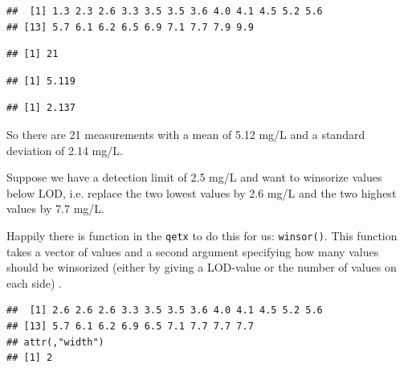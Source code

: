 \documentclass{tufte-book}
\begin{document}
\begin{knitrout}
\color{fgcolor}\begin{kframe}
\begin{alltt}
\end{alltt}
\begin{verbatim}
##  [1] 1.3 2.3 2.6 3.3 3.5 3.5 3.6 4.0 4.1 4.5 5.2 5.6
## [13] 5.7 6.1 6.2 6.5 6.9 7.1 7.7 7.9 9.9
\end{verbatim}
\begin{alltt}
\end{alltt}
\begin{verbatim}
## [1] 21
\end{verbatim}
\begin{alltt}
\end{alltt}
\begin{verbatim}
## [1] 5.119
\end{verbatim}
\begin{alltt}
\end{alltt}
\begin{verbatim}
## [1] 2.137
\end{verbatim}
\end{kframe}
\end{knitrout}






So there are 21 measurements with a mean of 5.12 mg/L and a standard deviation of 2.14 mg/L. 

Suppose we have a detection limit of 2.5 mg/L and want to winsorize values below
LOD, i.e. replace the two lowest values by 2.6 mg/L and the two highest values by 
7.7 mg/L.

\newpage

Happily there is function in the \verb|qetx| to do this for us: \verb|winsor()|.
This function takes a vector of values and a second argument specifying how 
many values should be winsorized (either by giving a LOD-value or the number of
values on each side) .

\begin{knitrout}
\color{fgcolor}\begin{kframe}
\begin{alltt}
 \hlkwb{<-}   \hlstd{=} \hlstd{)}
\end{alltt}
\begin{verbatim}
##  [1] 2.6 2.6 2.6 3.3 3.5 3.5 3.6 4.0 4.1 4.5 5.2 5.6
## [13] 5.7 6.1 6.2 6.9 6.5 7.1 7.7 7.7 7.7
## attr(,"width")
## [1] 2
\end{verbatim}
\end{kframe}
\end{knitrout}
\end{document}
